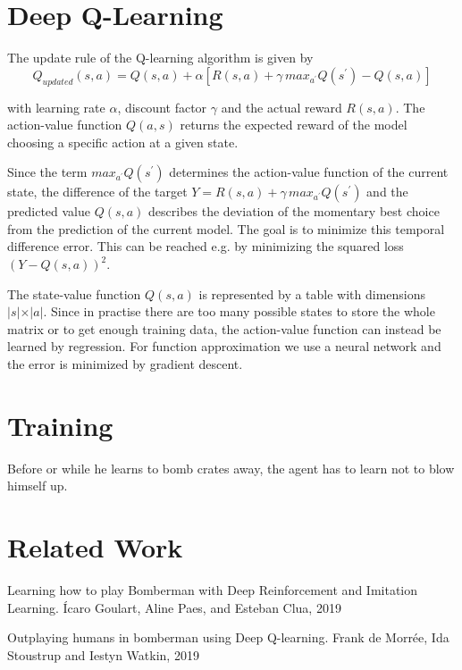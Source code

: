 \documentclass[a4paper ,12pt]{report}
\begin{document}
	\section*{Deep Q-Learning}
	The update rule of the Q-learning algorithm is given by
	\begin{equation}
	Q_{updated}(s,a) = Q(s,a) + \alpha\left[R(s,a) + \gamma \, max_{a^{\prime}} Q\left(s^{\prime}\right) - Q(s,a)\right]
	\end{equation}

	with learning rate $\alpha$, discount factor $\gamma$ and the actual reward $R(s,a)$. The action-value function $Q(a,s)$ returns the expected reward of the model choosing a specific action at a given state.
	
	Since the term $max_{a^{\prime}} Q\left(s^{\prime}\right)$ determines the action-value function of the current state, the difference of the target $Y = R(s,a) + \gamma \, max_{a^{\prime}} Q\left(s^{\prime}\right)$ and the predicted value $Q(s,a)$ describes the deviation of the momentary best choice from the prediction of the current model. The goal is to minimize this temporal difference error. This can be reached e.g. by minimizing the squared loss $(Y-Q(s,a))^2$.\cite{UBHD-68505368}
	
	\vspace{0.5cm}
	
	The state-value function $Q(s, a)$ is represented by a table with dimensions $\lvert s \lvert \times \lvert a \lvert $. Since in practise there are too many possible states to store the whole matrix or to get enough training data, the action-value function can instead be learned by regression. For function approximation we use a neural network and the error is minimized by gradient descent. \cite{Lecture}
	
	\section*{Training}
	Before or while he learns to bomb crates away, the agent has to learn not to blow himself up.
	
	\section*{Related Work}
	Learning how to play Bomberman with Deep Reinforcement and Imitation Learning. Ícaro Goulart, Aline Paes, and Esteban Clua, 2019 \cite{GoulartBomberman}
	
	Outplaying humans in bomberman using Deep Q-learning. Frank de Morrée, Ida Stoustrup and Iestyn Watkin, 2019 \cite{AlanPresentation}
	
\end{document}
